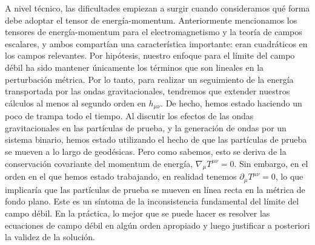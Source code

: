 \documentclass[11pt,b5paper,openany,twoside]{book}
\newcommand{\mn}{{\mu\nu}}
\newcommand{\p}[1]{{\partial_{#1}}}
\begin{document}
A nivel técnico, las dificultades empiezan a surgir cuando consideramos qué forma debe adoptar el tensor de energía-momentum.
Anteriormente mencionamos los tensores de energía-momentum para el electromagnetismo y la teoría de campos escalares, y ambos compartían una característica importante: eran cuadráticos en los campos relevantes.
Por hipótesis, nuestro enfoque para el límite del campo débil ha sido mantener únicamente los términos que son lineales en la perturbación métrica.
Por lo tanto, para realizar un seguimiento de la energía transportada por las ondas gravitacionales, tendremos que extender nuestros cálculos al menos al segundo orden en $h_\mn$.
De hecho, hemos estado haciendo un poco de trampa todo el tiempo.
Al discutir los efectos de las ondas gravitacionales en las partículas de prueba, y la generación de ondas por un sistema binario, hemos estado utilizando el hecho de que las partículas de prueba se mueven a lo largo de geodésicas.
Pero como sabemos, esto se deriva de la conservación covariante del momentum de energía, $\nabla_\mu T^\mn=0$.
Sin embargo, en el orden en el que hemos estado trabajando, en realidad tenemos $\p\mu T^\mn=0$, lo que implicaría que las partículas de prueba se mueven en línea recta en la métrica de fondo plano.
Este es un síntoma de la inconsistencia fundamental del límite del campo débil.
En la práctica, lo mejor que se puede hacer es resolver las ecuaciones de campo débil en algún orden apropiado y luego justificar a posteriori la validez de la solución.
\end{document}

